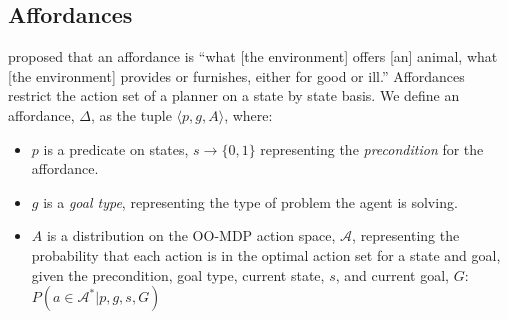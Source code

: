 \documentclass[conference]{IEEEtran}
\begin{document}



\subsection{Affordances}

\citet{gibson77} proposed that an affordance is ``what [the
  environment] offers [an] animal, what [the environment] provides or
furnishes, either for good or ill.''  Affordances restrict the action
set of a planner on a state by state basis.  We
define an affordance, $\Delta$, as the tuple $\langle p, g, A
\rangle$, where:
\begin{itemize}
\item $p$ is a predicate on states, $s \longrightarrow \{$0$, 1\}$ representing the {\em precondition} for the affordance. 
\item $g$ is a {\it goal type}, representing the type of problem the agent is solving.
\item $A$ is a distribution on the OO-MDP action space, $\mathcal{A}$, representing the probability that each action is in the optimal action set for a state and goal, given the precondition, goal type, current state, $s$, and current goal, $G$: $P(a \in \mathcal{A}^* | p, g, s, G)$
\end{itemize}
\end{document}
